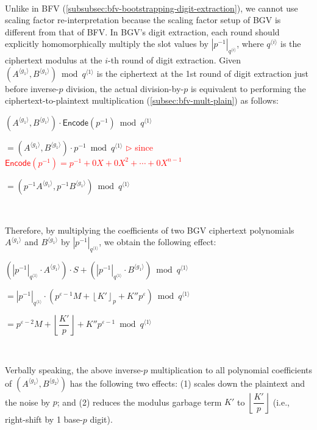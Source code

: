 \begin{enumerate}
$ $

 Unlike in BFV (\autoref{subsubsec:bfv-bootstrapping-digit-extraction}), we cannot use scaling factor re-interpretation because the scaling factor setup of BGV is different from that of BFV. In BGV's digit extraction, each round should explicitly homomorphically multiply the slot values by $|p^{-1}|_{q^{\langle i \rangle}}$, where $q^{\langle i \rangle}$ is the ciphertext modulus at the $i$-th round of digit extraction. Given $(A^{\langle g_1 \rangle}, B^{\langle g_1 \rangle}) \bmod q^{\langle 1 \rangle}$ is the ciphertext at the  1st round of digit extraction just before inverse-$p$ division, the actual division-by-$p$ is equivalent to performing the ciphertext-to-plaintext multiplication (\autoref{subsec:bfv-mult-plain}) as follows: 

$(A^{\langle g_1 \rangle}, B^{\langle g_1 \rangle}) \cdot \textsf{Encode}(p^{-1}) \bmod q^{\langle 1 \rangle}$

$= (A^{\langle g_1 \rangle}, B^{\langle g_1 \rangle}) \cdot p^{-1} \bmod q^{\langle 1 \rangle}$ \textcolor{red}{ $\rhd$ since $\textsf{Encode}(p^{-1}) = p^{-1} + 0X + 0X^2 + \cdots + 0X^{n-1}$ }

$= (p^{-1}A^{\langle g_1 \rangle}, p^{-1}B^{\langle g_1 \rangle}) \bmod q^{\langle 1 \rangle}$

$ $

Therefore, by multiplying the coefficients of two BGV ciphertext polynomials $A^{\langle g_1 \rangle}$ and $B^{\langle g_1 \rangle}$ by $|p^{-1}|_{q^{\langle 1 \rangle}}$, we obtain the following effect: 

$(|p^{-1}|_{q^{\langle 1 \rangle}} \cdot A^{\langle g_1 \rangle})\cdot S + (|p^{-1}|_{q^{\langle 1 \rangle}} \cdot B^{\langle g_1 \rangle}) \bmod q^{\langle 1 \rangle}$

$= |p^{-1}|_{q^{\langle 1 \rangle}} \cdot (p^{\varepsilon - 1}M + \left\lfloor{K'}\right\rfloor_p + K''p^{\varepsilon}) \bmod q^{\langle 1 \rangle}$


$= p^{\varepsilon - 2}M + \left\lfloor\dfrac{K'}{p}\right\rfloor + K''p^{\varepsilon-1} \bmod q^{\langle 1 \rangle} $

$ $

Verbally speaking, the above inverse-$p$ multiplication to all polynomial coefficients of $(A^{\langle g_1 \rangle}, B^{\langle g_2 \rangle})$ has the following two effects: (1) scales down the plaintext and the noise by $p$; and (2) reduces the modulus garbage term $K'$ to $\left\lfloor\dfrac{K'}{p}\right\rfloor$ (i.e., right-shift by 1 base-$p$ digit). 


\end{enumerate}
